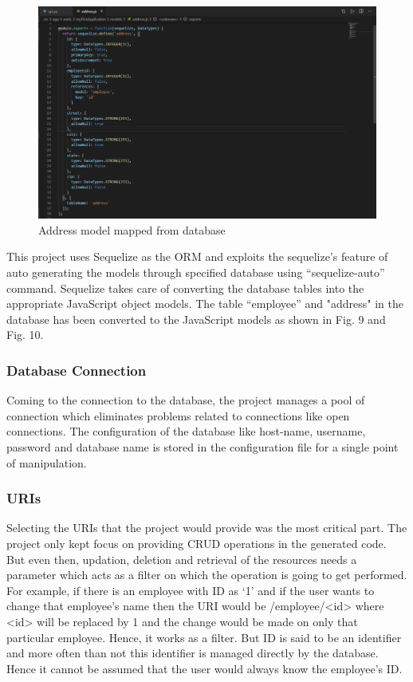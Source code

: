 \documentclass[letterpaper, 10 pt, conference]{ieeeconf}
\begin{document}
\begin{figure}[h]
   \centering
   \includegraphics[scale=0.21]{./fig7.png}
   \caption{Address model mapped from database}
   \label{fig:my_label}
\end{figure}

This project uses Sequelize as the ORM and exploits the sequelize’s feature of auto generating the models through specified database using “sequelize-auto” command. Sequelize takes care of converting the database tables into the appropriate JavaScript object models. The table “employee” and "address" in the database has been converted to the JavaScript models as shown in Fig. 9 and Fig. 10.


\subsubsection{Database Connection}
Coming to the connection to the database, the project manages a pool of connection which eliminates problems related to connections like open connections. The configuration of the database like host-name, username, password and database name is stored in the configuration file for a single point of manipulation.

\subsubsection{URIs}
Selecting the URIs that the project would provide was the most critical part. The project only kept focus on providing CRUD operations in the generated code. But even then, updation, deletion and retrieval of the resources needs a parameter which acts as a filter on which the operation is going to get performed. For example, if there is an employee with ID as ‘1’ and if the user wants to change that employee’s name then the URI would be /employee/<id> where <id> will be replaced by 1 and the change would be made on only that particular employee. Hence, it works as a filter. But ID is said to be an identifier and more often than not this identifier is managed directly by the database. Hence it cannot be assumed that the user would always know the employee’s ID. 
\end{document}
